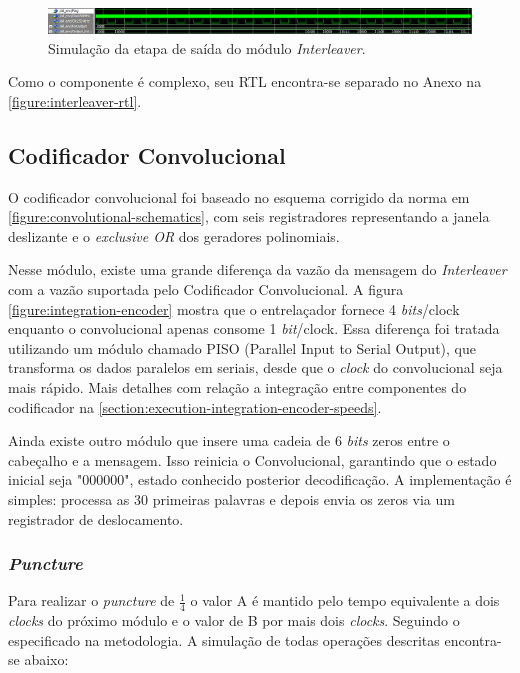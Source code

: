 	\begin{figure}[h]
		\caption{\label{figure:interleaver-simulation-flush}Simulação da etapa de saída do módulo \textit{Interleaver}.}
		\centering
		\includegraphics[width=1\textwidth]{interleaver/simulation-flush.png}
	\end{figure}

	Como o componente é complexo, seu RTL encontra-se separado no Anexo na \autoref{figure:interleaver-rtl}.
	
	\subsection{Codificador Convolucional}	
	
	O codificador convolucional foi baseado no esquema corrigido da norma em \autoref{figure:convolutional-schematics}, com seis registradores representando a janela deslizante e o \textit{exclusive OR} dos geradores polinomiais.
	
	Nesse módulo, existe uma grande diferença da vazão da mensagem do \textit{Interleaver} com a vazão suportada pelo Codificador Convolucional. A figura \autoref{figure:integration-encoder} mostra que o entrelaçador fornece 4 \textit{bits}/clock enquanto o convolucional apenas consome 1 \textit{bit}/clock. Essa diferença foi tratada utilizando um módulo chamado PISO (Parallel Input to Serial Output), que transforma os dados paralelos em seriais, desde que o \textit{clock} do convolucional seja mais rápido. Mais detalhes com relação a integração entre componentes do codificador na \autoref{section:execution-integration-encoder-speeds}.

	Ainda existe outro módulo que insere uma cadeia de 6 \textit{bits} zeros entre o cabeçalho e a mensagem. Isso reinicia o Convolucional, garantindo que o estado inicial seja "000000", estado conhecido posterior decodificação. A implementação é simples: processa as 30 primeiras palavras e depois envia os zeros via um registrador de deslocamento.
	
	\subsubsection{\textit{Puncture}}
	
	Para realizar o \textit{puncture} de $\frac{1}{4}$ o valor A é mantido pelo tempo equivalente a dois \textit{clocks} do próximo módulo e o valor de B por mais dois \textit{clocks}. Seguindo o especificado na metodologia. A simulação de todas operações descritas encontra-se abaixo:
	
